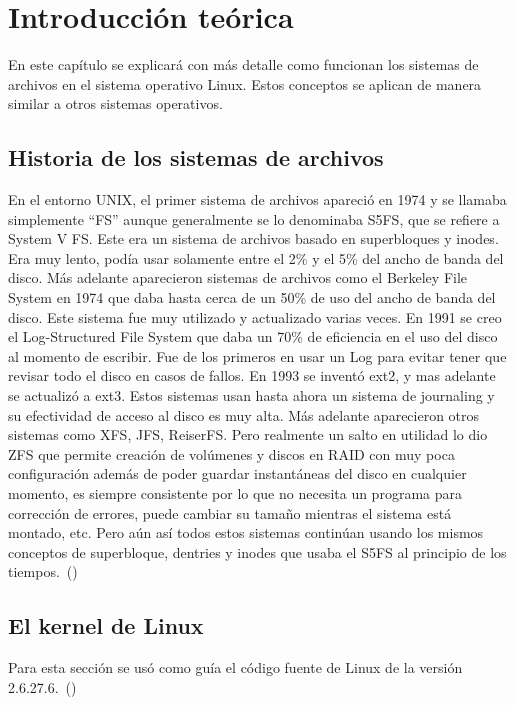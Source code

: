 \chapter{Introducción teórica}

En este capítulo se explicará con más detalle como funcionan los sistemas de archivos en el sistema operativo Linux. Estos conceptos se aplican de manera similar a otros sistemas operativos.


\section{Historia de los sistemas de archivos}

En el entorno UNIX, el primer sistema de archivos apareció en 1974 y se llamaba simplemente ``FS'' aunque generalmente se lo denominaba S5FS, que se refiere a System V FS. Este era un sistema de archivos basado en superbloques y inodes. Era muy lento, podía usar solamente entre el 2\% y el 5\% del ancho de banda del disco. Más adelante aparecieron sistemas de archivos como el Berkeley File System en 1974 que daba hasta cerca de un 50\% de uso del ancho de banda del disco. Este sistema fue muy utilizado y actualizado varias veces. En 1991 se creo el Log-Structured File System que daba un 70\% de eficiencia en el uso del disco al momento de escribir. Fue de los primeros en usar un Log para evitar tener que revisar todo el disco en casos de fallos. En 1993 se inventó ext2, y mas adelante se actualizó a ext3. Estos sistemas usan hasta ahora un sistema de journaling y su efectividad de acceso al disco es muy alta. Más adelante aparecieron otros sistemas como XFS, JFS, ReiserFS. Pero realmente un salto en utilidad lo dio ZFS que permite creación de volúmenes y discos en RAID con muy poca configuración además de poder guardar instantáneas del disco en cualquier momento, es siempre consistente por lo que no necesita un programa para corrección de errores, puede cambiar su tamaño mientras el sistema está montado, etc. Pero aún así todos estos sistemas continúan usando los mismos conceptos de superbloque, dentries y inodes que usaba el S5FS al principio de los tiempos.~(\cite{history:website})


\section{El kernel de Linux}

Para esta sección se usó como guía el código fuente de Linux de la versión 2.6.27.6.~(\cite{linuxsource:website})


